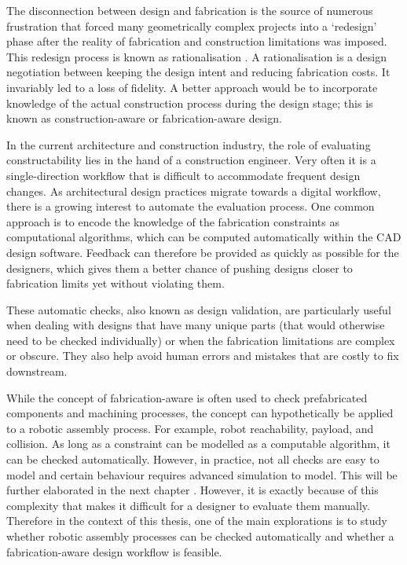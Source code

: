 The disconnection between design and fabrication is the source of numerous frustration that forced many geometrically complex projects into a ‘redesign’ phase after the reality of fabrication and construction limitations was imposed. This redesign process is known as rationalisation \parencite{pottmannArchitecturalGeometryFabricationAware2013}. A rationalisation is a design negotiation between keeping the design intent and reducing fabrication costs. It invariably led to a loss of fidelity. A better approach would be to incorporate knowledge of the actual construction process during the design stage; this is known as construction-aware or fabrication-aware design.

In the current architecture and construction industry, the role of evaluating constructability lies in the hand of a construction engineer. Very often it is a single-direction workflow that is difficult to accommodate frequent design changes. As architectural design practices migrate towards a digital workflow, there is a growing interest to automate the evaluation process. One common approach is to encode the knowledge of the fabrication constraints as computational algorithms, which can be computed automatically within the CAD design software. Feedback can therefore be provided as quickly as possible for the designers, which gives them a better chance of pushing designs closer to fabrication limits yet without violating them. 

These automatic checks, also known as design validation, are particularly useful when dealing with designs that have many unique parts (that would otherwise need to be checked individually) or when the fabrication limitations are complex or obscure. They also help avoid human errors and mistakes that are costly to fix downstream. 

While the concept of fabrication-aware is often used to check prefabricated components and machining processes, the concept can hypothetically be applied to a robotic assembly process. For example, robot reachability, payload, and collision. As long as a constraint can be modelled as a computable algorithm, it can be checked automatically. However, in practice, not all checks are easy to model and certain behaviour requires advanced simulation to model. This will be further elaborated in the next chapter . However, it is exactly because of this complexity that makes it difficult for a designer to evaluate them manually. Therefore in the context of this thesis, one of the main explorations is to study whether robotic assembly processes can be checked automatically and whether a fabrication-aware design workflow is feasible. 

